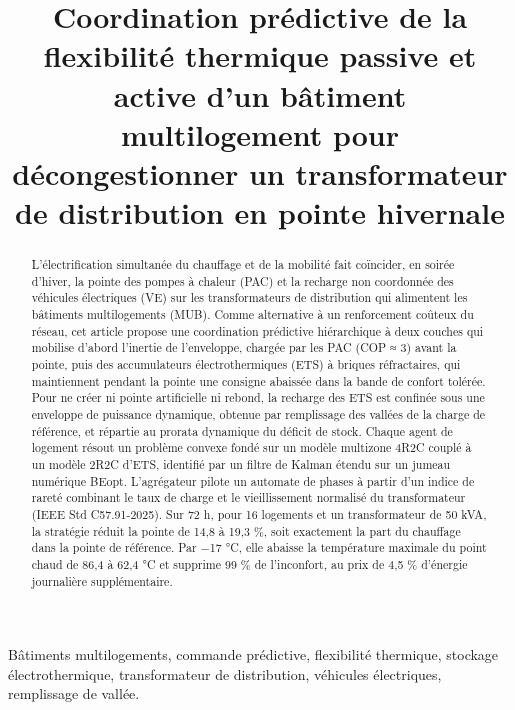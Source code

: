 \documentclass[conference]{IEEEtran}
\begin{document}
\title{Coordination prédictive de la flexibilité thermique passive et active d'un bâtiment multilogement pour décongestionner un transformateur de distribution en pointe hivernale}
\author{%
%
}
\maketitle
\begin{abstract}
L'électrification simultanée du chauffage et de la mobilité fait coïncider, en soirée d'hiver, la pointe des pompes à chaleur (PAC) et la recharge non coordonnée des véhicules électriques (VE) sur les transformateurs de distribution qui alimentent les bâtiments multilogements (MUB). Comme alternative à un renforcement coûteux du réseau, cet article propose une coordination prédictive hiérarchique à deux couches qui mobilise d'abord l'inertie de l'enveloppe, chargée par les PAC (COP ≈ 3) avant la pointe, puis des accumulateurs électrothermiques (ETS) à briques réfractaires, qui maintiennent pendant la pointe une consigne abaissée dans la bande de confort tolérée. Pour ne créer ni pointe artificielle ni rebond, la recharge des ETS est confinée sous une enveloppe de puissance dynamique, obtenue par remplissage des vallées de la charge de référence, et répartie au prorata dynamique du déficit de stock. Chaque agent de logement résout un problème convexe fondé sur un modèle multizone 4R2C couplé à un modèle 2R2C d'ETS, identifié par un filtre de Kalman étendu sur un jumeau numérique BEopt. L'agrégateur pilote un automate de phases à partir d'un indice de rareté combinant le taux de charge et le vieillissement normalisé du transformateur (IEEE Std C57.91-2025). Sur 72 h, pour 16 logements et un transformateur de 50 kVA, la stratégie réduit la pointe de 14,8 à 19,3 \%, soit exactement la part du chauffage dans la pointe de référence. Par −17 °C, elle abaisse la température maximale du point chaud de 86,4 à 62,4 °C et supprime 99 \% de l'inconfort, au prix de 4,5 \% d'énergie journalière supplémentaire.
\end{abstract}
\begin{IEEEkeywords}
Bâtiments multilogements, commande prédictive, flexibilité thermique, stockage électrothermique, transformateur de distribution, véhicules électriques, remplissage de vallée.
\end{IEEEkeywords}
\end{document}
